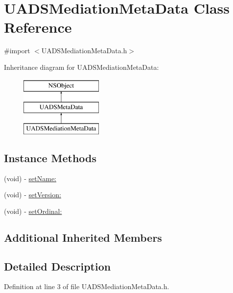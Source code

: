 \hypertarget{interface_u_a_d_s_mediation_meta_data}{}\section{U\+A\+D\+S\+Mediation\+Meta\+Data Class Reference}
\label{interface_u_a_d_s_mediation_meta_data}


{\ttfamily \#import $<$U\+A\+D\+S\+Mediation\+Meta\+Data.\+h$>$}

Inheritance diagram for U\+A\+D\+S\+Mediation\+Meta\+Data\+:\begin{figure}[H]
\begin{center}
\leavevmode
\includegraphics[height=3.000000cm]{interface_u_a_d_s_mediation_meta_data}
\end{center}
\end{figure}
\subsection*{Instance Methods}
\begin{DoxyCompactItemize}
\item 
(void) -\/ \mbox{\hyperlink{interface_u_a_d_s_mediation_meta_data_a3597aac41b79b3e8ad1db1f5331b3331}{set\+Name\+:}}
\item 
(void) -\/ \mbox{\hyperlink{interface_u_a_d_s_mediation_meta_data_a7852264d4512e6337ad780317bae68bb}{set\+Version\+:}}
\item 
(void) -\/ \mbox{\hyperlink{interface_u_a_d_s_mediation_meta_data_a870990c2a08f4153b71dbc6db30f5090}{set\+Ordinal\+:}}
\end{DoxyCompactItemize}
\subsection*{Additional Inherited Members}


\subsection{Detailed Description}


Definition at line 3 of file U\+A\+D\+S\+Mediation\+Meta\+Data.\+h.



